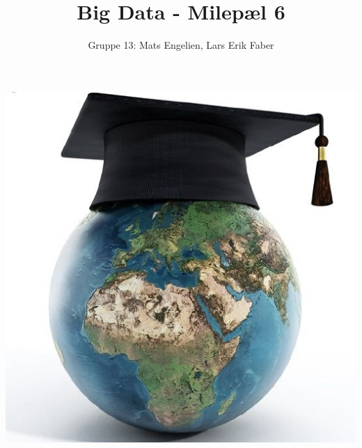 \documentclass[12pt]{article}
\begin{document}
\title{Big Data - Milepæl 6}
\author{Gruppe 13: Mats Engelien, Lars Erik Faber}
\date{}
\maketitle
\begin{center}
    \includegraphics[scale=0.5]{images/world_education.jpg}    
\end{center}
\thispagestyle{empty}
\newpage
\tableofcontents
\thispagestyle{empty}
\newpage
\setcounter{page}{1}







\end{document}
